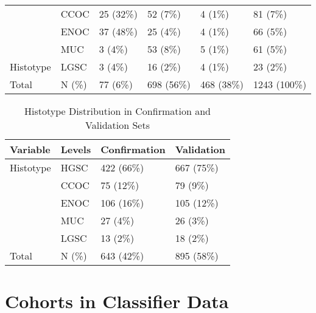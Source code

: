 \documentclass[
]{report}
\begin{document}
\begin{table}
\begin{tabular}[t]{l|l|l|l|l|l}
\cline{2-6}
 & CCOC & 25 (32\%) & 52 (7\%) & 4 (1\%) & 81 (7\%)\\
\cline{2-6}
 & ENOC & 37 (48\%) & 25 (4\%) & 4 (1\%) & 66 (5\%)\\
\cline{2-6}
 & MUC & 3 (4\%) & 53 (8\%) & 5 (1\%) & 61 (5\%)\\
\cline{2-6}
\multirow{-5}{*}{\raggedright\arraybackslash \hspace{1em}Histotype} & LGSC & 3 (4\%) & 16 (2\%) & 4 (1\%) & 23 (2\%)\\
\cline{1-6}
\hspace{1em}Total & N (\%) & 77 (6\%) & 698 (56\%) & 468 (38\%) & 1243 (100\%)\\
\hline
\end{tabular}
\end{table}

\begin{table}

\caption{\label{tab:hist-conf-val}Histotype Distribution in Confirmation and Validation Sets}
\centering
\begin{tabular}[t]{l|l|l|l}
\hline
Variable & Levels & Confirmation & Validation\\
\hline
Histotype & HGSC & 422 (66\%) & 667 (75\%)\\
\hline
 & CCOC & 75 (12\%) & 79 (9\%)\\
\hline
 & ENOC & 106 (16\%) & 105 (12\%)\\
\hline
 & MUC & 27 (4\%) & 26 (3\%)\\
\hline
 & LGSC & 13 (2\%) & 18 (2\%)\\
\hline
Total & N (\%) & 643 (42\%) & 895 (58\%)\\
\hline
\end{tabular}
\end{table}

\section{Cohorts in Classifier Data}\label{cohorts-in-classifier-data}
\end{document}
